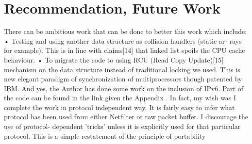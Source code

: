 \chapter{Recommendation, Future Work}
There can be ambitious work that can be done to better this work which include:
• Testing and using another data structure as collision handlers (static ar-
rays for example). This is in line with claims[14] that linked list spoils
the CPU cache behaviour.
• To migrate the code to using RCU (Read Copy Update)[15] mechanism
on the data structure instead of traditional locking we used. This is new
elegant paradigm of synchronization of multiprocessors though patented
by IBM.
And yes, the Author has done some work on the inclusion of IPv6. Part of the code
can be found in the link given the Appendix . In fact, my wish was I complete the
work in protocol independent way. It is fairly easy to infer what protocol has been
used from either Netfilter or raw packet buffer. I discourage the use of protocol-
dependent ’tricks’ unless it is explicitly used for that particular protocol. This is a
simple restatement of the principle of portability

